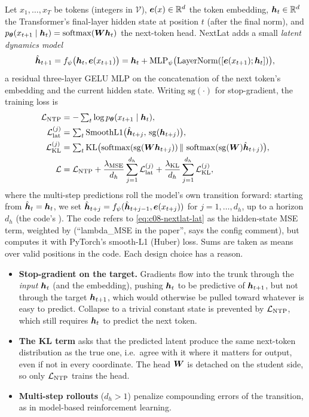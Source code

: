 Let $x_1,\dots,x_T$ be tokens (integers in $\mathcal{V}$), $\bm{e}(x)\in\mathbb{R}^d$ the token embedding,
$\bm{h}_t\in\mathbb{R}^d$ the Transformer's final-layer hidden state at position $t$ (after the final norm),
and $p_{\bm{\theta}}(x_{t+1}\mid\bm{h}_t)=\operatorname{softmax}(\bm{W}\bm{h}_t)$ the next-token head. NextLat adds a small
\emph{latent dynamics model}
\begin{equation}\label{eq:c08-nextlat-f}
  \hat{\bm{h}}_{t+1}=f_\psi\bigl(\bm{h}_t,\bm{e}(x_{t+1})\bigr)=\bm{h}_t+\mathrm{MLP}_\psi\bigl(\operatorname{LayerNorm}([\bm{e}(x_{t+1});\bm{h}_t])\bigr),
\end{equation}
a residual three-layer GELU MLP on the concatenation of the next token's embedding and the current
hidden state. Writing $\mathrm{sg}(\cdot)$ for stop-gradient, the training loss is
\begin{align}
  \mathcal{L}_{\mathrm{NTP}} &= -\textstyle\sum_t\log p_{\bm{\theta}}(x_{t+1}\mid\bm{h}_t), \nonumber\\
  \mathcal{L}_{\mathrm{lat}}^{(j)} &= \textstyle\sum_t \mathrm{SmoothL1}\bigl(\hat{\bm{h}}_{t+j},\,\mathrm{sg}(\bm{h}_{t+j})\bigr), \label{eq:c08-nextlat-lat}\\
  \mathcal{L}_{\mathrm{KL}}^{(j)} &= \textstyle\sum_t \mathrm{KL}\bigl(\operatorname{softmax}(\mathrm{sg}(\bm{W}\bm{h}_{t+j}))\,\|\,\operatorname{softmax}(\mathrm{sg}(\bm{W})\hat{\bm{h}}_{t+j})\bigr), \label{eq:c08-nextlat-kl}\\
  \mathcal{L} &= \mathcal{L}_{\mathrm{NTP}}+\frac{\lambda_{\mathrm{MSE}}}{d_h}\sum_{j=1}^{d_h}\mathcal{L}_{\mathrm{lat}}^{(j)}
          +\frac{\lambda_{\mathrm{KL}}}{d_h}\sum_{j=1}^{d_h}\mathcal{L}_{\mathrm{KL}}^{(j)} , \label{eq:c08-nextlat-total}
\end{align}
where the multi-step predictions roll the model's own transition forward: starting from
$\hat{\bm{h}}_t=\bm{h}_t$, we set $\hat{\bm{h}}_{t+j}=f_\psi(\hat{\bm{h}}_{t+j-1},\bm{e}(x_{t+j}))$ for $j=1,\dots,d_h$,
up to a horizon $d_h$ (the code's ). The code refers to \eqref{eq:c08-nextlat-lat} as the
hidden-state MSE term, weighted by  (``lambda\_MSE in the paper'', says the config
comment), but computes it with PyTorch's smooth-L1 (Huber) loss. Sums are
taken as means over valid positions in the code. Each design choice has a reason.
\begin{itemize}
  \item \textbf{Stop-gradient on the target.} Gradients flow into the trunk through the
  \emph{input} $\bm{h}_t$ (and the embedding), pushing $\bm{h}_t$ to be predictive of $\bm{h}_{t+1}$, but not
  through the target $\bm{h}_{t+1}$, which would otherwise be pulled toward whatever is easy to predict.
  Collapse to a trivial constant state is prevented by $\mathcal{L}_{\mathrm{NTP}}$, which still requires
  $\bm{h}_t$ to predict the next token.
  \item \textbf{The KL term} asks that the predicted latent produce the same next-token distribution
  as the true one, i.e.\ agree with it where it matters for output, even if not in every coordinate.
  The head $\bm{W}$ is detached on the student side, so only $\mathcal{L}_{\mathrm{NTP}}$ trains the head.
  \item \textbf{Multi-step rollouts} ($d_h>1$) penalize compounding errors of the transition, as in
  model-based reinforcement learning.
\end{itemize}

